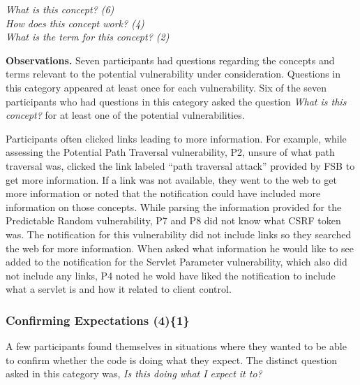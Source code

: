 \documentclass{acm_proc_article-sp}
\begin{document}
\noindent\emph{What is this concept? (6)} \\
\emph{How does this concept work? (4)} \\
\emph{What is the term for this concept? (2)}

\noindent\textbf{Observations.}
Seven participants had questions regarding the concepts and terms relevant to the potential vulnerability under consideration. 
Questions in this category appeared at least once for each vulnerability.
Six of the seven participants who had questions in this category asked the question \textit{What is this concept?} for at least one of the potential vulnerabilities.


Participants often clicked links leading to more information.
For example, while assessing the Potential Path Traversal vulnerability, P2, unsure of what path traversal was, clicked the link labeled ``path traversal attack'' provided by FSB to get more information.
If a link was not available, they went to the web to get more information or noted that the notification could have included more information on those concepts.
While parsing the information provided for the Predictable Random vulnerability, P7 and P8 did not know what CSRF token was.
The notification for this vulnerability did not include links so they searched the web for more information. 
When asked what information he would like to see added to the notification for the Servlet Parameter vulnerability, which also did not include any links, P4 noted he wold have liked the notification to include what a servlet is and how it related to client control.



\subsubsection{\textbf{Confirming Expectations (4)\{1\}}}\label{ce}

A few participants found themselves in situations where they wanted to be able to confirm whether the code is doing what they expect. 
The distinct question asked in this category was, \textit{Is this doing what I expect it to?} 
\end{document}
